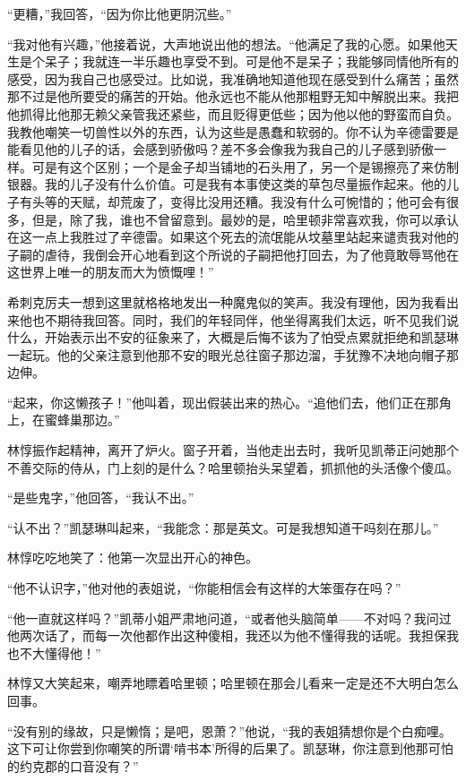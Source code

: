 \par “更糟，”我回答，“因为你比他更阴沉些。”
\par “我对他有兴趣，”他接着说，大声地说出他的想法。“他满足了我的心愿。如果他天生是个呆子；我就连一半乐趣也享受不到。可是他不是呆子；我能够同情他所有的感受，因为我自己也感受过。比如说，我准确地知道他现在感受到什么痛苦；虽然那不过是他所要受的痛苦的开始。他永远也不能从他那粗野无知中解脱出来。我把他抓得比他那无赖父亲管我还紧些，而且贬得更低些；因为他以他的野蛮而自负。我教他嘲笑一切兽性以外的东西，认为这些是愚蠢和软弱的。你不认为辛德雷要是能看见他的儿子的话，会感到骄傲吗？差不多会像我为我自己的儿子感到骄傲一样。可是有这个区别；一个是金子却当铺地的石头用了，另一个是锡擦亮了来仿制银器。我的儿子没有什么价值。可是我有本事使这类的草包尽量振作起来。他的儿子有头等的天赋，却荒废了，变得比没用还糟。我没有什么可惋惜的；他可会有很多，但是，除了我，谁也不曾留意到。最妙的是，哈里顿非常喜欢我，你可以承认在这一点上我胜过了辛德雷。如果这个死去的流氓能从坟墓里站起来谴责我对他的子嗣的虐待，我倒会开心地看到这个所说的子嗣把他打回去，为了他竟敢辱骂他在这世界上唯一的朋友而大为愤慨哩！”
\par 希刺克厉夫一想到这里就格格地发出一种魔鬼似的笑声。我没有理他，因为我看出来他也不期待我回答。同时，我们的年轻同伴，他坐得离我们太远，听不见我们说什么，开始表示出不安的征象来了，大概是后悔不该为了怕受点累就拒绝和凯瑟琳一起玩。他的父亲注意到他那不安的眼光总往窗子那边溜，手犹豫不决地向帽子那边伸。
\par “起来，你这懒孩子！”他叫着，现出假装出来的热心。“追他们去，他们正在那角上，在蜜蜂巢那边。”
\par 林惇振作起精神，离开了炉火。窗子开着，当他走出去时，我听见凯蒂正问她那个不善交际的侍从，门上刻的是什么？哈里顿抬头呆望着，抓抓他的头活像个傻瓜。
\par “是些鬼字，”他回答，“我认不出。”
\par “认不出？”凯瑟琳叫起来，“我能念：那是英文。可是我想知道干吗刻在那儿。”
\par 林惇吃吃地笑了：他第一次显出开心的神色。
\par “他不认识字，”他对他的表姐说，“你能相信会有这样的大笨蛋存在吗？”
\par “他一直就这样吗？”凯蒂小姐严肃地问道，“或者他头脑简单——不对吗？我问过他两次话了，而每一次他都作出这种傻相，我还以为他不懂得我的话呢。我担保我也不大懂得他！”
\par 林惇又大笑起来，嘲弄地瞟着哈里顿；哈里顿在那会儿看来一定是还不大明白怎么回事。
\par “没有别的缘故，只是懒惰；是吧，恩萧？”他说，“我的表姐猜想你是个白痴哩。这下可让你尝到你嘲笑的所谓‘啃书本’所得的后果了。凯瑟琳，你注意到他那可怕的约克郡的口音没有？”
